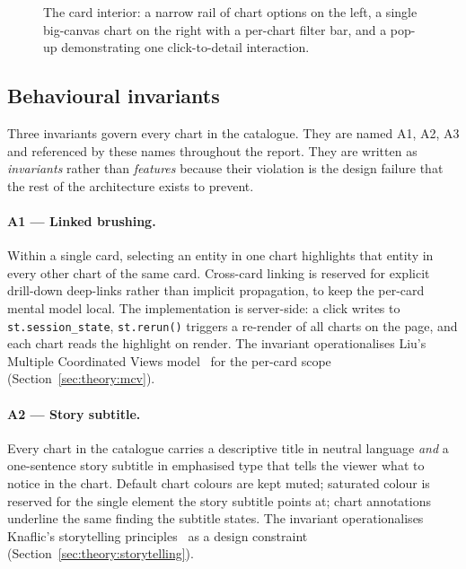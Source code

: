 \begin{figure}[H]
\centering
{}
\caption{The card interior: a narrow rail of chart options on
the left, a single big-canvas chart on the right with a
per-chart filter bar, and a pop-up demonstrating one
click-to-detail interaction.}
\label{fig:proposed:card_interior}
\end{figure}

\subsection{Behavioural invariants}
\label{sec:proposed:invariants}

Three invariants govern every chart in the catalogue. They are
named A1, A2, A3 and referenced by these names throughout the
report. They are written as \emph{invariants} rather than
\emph{features} because their violation is the design failure
that the rest of the architecture exists to prevent.

\paragraph{A1 --- Linked brushing.}
Within a single card, selecting an entity in one chart highlights
that entity in every other chart of the same card. Cross-card
linking is reserved for explicit drill-down deep-links rather
than implicit propagation, to keep the per-card mental model
local. The implementation is server-side: a click writes to
\texttt{st.session\_state}, \texttt{st.rerun()} triggers a
re-render of all charts on the page, and each chart reads the
highlight on render. The invariant operationalises Liu's
Multiple Coordinated Views model~\cite{liu2022} for the per-card
scope (Section~\ref{sec:theory:mcv}).

\paragraph{A2 --- Story subtitle.}
Every chart in the catalogue carries a descriptive title in
neutral language \emph{and} a one-sentence story subtitle in
emphasised type that tells the viewer what to notice in the
chart. Default chart colours are kept muted; saturated colour is
reserved for the single element the story subtitle points at;
chart annotations underline the same finding the subtitle
states. The invariant operationalises Knaflic's storytelling
principles~\cite{knaflic2015} as a design constraint
(Section~\ref{sec:theory:storytelling}).


